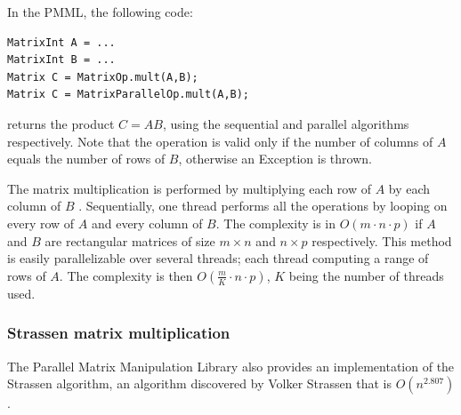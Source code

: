 \documentclass{dependencies/acm_proc_article-sp}
\begin{document}
In the PMML, the following code:
\begin{verbatim}
MatrixInt A = ...
MatrixInt B = ...
Matrix C = MatrixOp.mult(A,B);
Matrix C = MatrixParallelOp.mult(A,B);
\end{verbatim}
returns the product $C=AB$, using the sequential and parallel algorithms respectively. Note that the operation is valid only if the number of columns of $A$ equals the number of rows of $B$, otherwise an Exception is thrown.

The matrix multiplication is performed by multiplying each row of $A$ by each column of $B$ \cite{MatrixMultiplication}. Sequentially, one thread performs all the operations by looping on every row of $A$ and every column of $B$. The complexity is in $O(m\cdot n\cdot p)$ if $A$ and $B$ are rectangular matrices of size $m\times n$ and $n\times p$ respectively. This method is easily parallelizable over several threads; each thread computing a range of rows of $A$. The complexity is then $O( \frac{m}{K}\cdot n\cdot p )$, $K$ being the number of threads used.

\subsubsection{Strassen matrix multiplication}
The Parallel Matrix Manipulation Library also provides an implementation of the Strassen algorithm, an algorithm discovered by Volker Strassen that is $O( n^{2.807})$ \cite{StrassenAlgorithm}.
\end{document}
